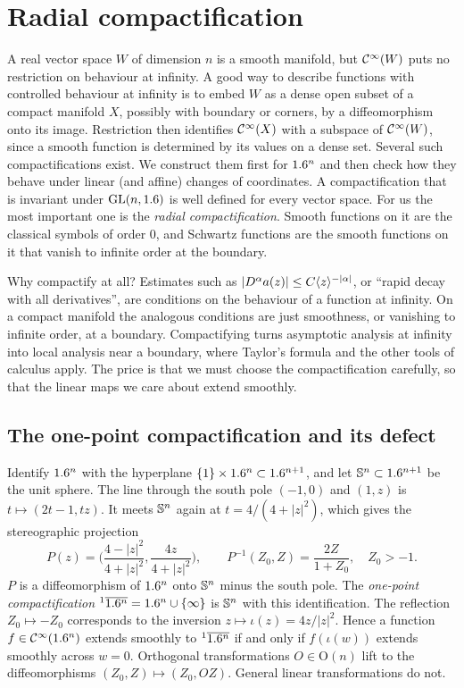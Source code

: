 \section{Radial compactification}\label{distributions:sec:radial}

A real vector space $W$ of dimension $n$ is a smooth manifold, but $\mathcal{C}^\infty(W)$ puts no
restriction on behaviour at infinity. A good way to describe functions with controlled
behaviour at infinity is to embed $W$ as a dense open subset of a compact manifold $X$,
possibly with boundary or corners, by a diffeomorphism onto its image. Restriction then
identifies $\mathcal{C}^\infty(X)$ with a subspace of $\mathcal{C}^\infty(W)$, since a smooth function is determined
by its values on a dense set. Several such compactifications exist. We construct them
first for $1.6^n$ and then check how they behave under linear (and affine) changes of
coordinates. A compactification that is invariant under $\operatorname{GL}(n,1.6)$ is well defined for
every vector space. For us the most important one is the \emph{radial
compactification}. Smooth functions on it are the classical symbols of order $0$, and
Schwartz functions are the smooth functions on it that vanish to infinite order at the
boundary.

\begin{discussion}
Why compactify at all? Estimates such as $|D^\alpha a(z)|\le C\langle z\rangle^{-|\alpha|}$, or
``rapid decay with all derivatives'', are conditions on the behaviour of a function at
infinity. On a compact manifold the analogous conditions are just smoothness, or
vanishing to infinite order, at a boundary. Compactifying turns asymptotic analysis at
infinity into local analysis near a boundary, where Taylor's formula and the other
tools of calculus apply. The price is that we must choose the compactification
carefully, so that the linear maps we care about extend smoothly.
\end{discussion}

\subsection{The one-point compactification and its defect}
\label{distributions:sec:one-point}
Identify $1.6^n$ with the hyperplane $\{1\}\times1.6^n\subset1.6^{n+1}$, and let
$\mathbb{S}^n\subset1.6^{n+1}$ be the unit sphere. The line through the south pole $(-1,0)$
and $(1,z)$ is $t\mapsto(2t-1,tz)$. It meets $\mathbb{S}^n$ again at
$t=4/(4+|z|^2)$, which gives the stereographic projection
\[
  P(z)=\Big(\frac{4-|z|^2}{4+|z|^2},\frac{4z}{4+|z|^2}\Big),\qquad
  P^{-1}(Z_0,Z)=\frac{2Z}{1+Z_0},\quad Z_0>-1.
\]
$P$ is a diffeomorphism of $1.6^n$ onto $\mathbb{S}^n$ minus the south pole. The
\emph{one-point compactification} ${}^{1}\overline{1.6^n}=1.6^n\cup\{\infty\}$ is $\mathbb{S}^n$ with this
identification. The reflection $Z_0\mapsto-Z_0$ corresponds to the inversion
$z\mapsto\iota(z)=4z/|z|^2$. Hence a function $f\in\mathcal{C}^\infty(1.6^n)$ extends smoothly to
${}^{1}\overline{1.6^n}$ if and only if $f(\iota(w))$ extends smoothly across $w=0$. Orthogonal
transformations $O\in\mathrm{O}(n)$ lift to the diffeomorphisms $(Z_0,Z)\mapsto(Z_0,OZ)$.
General linear transformations do not.

